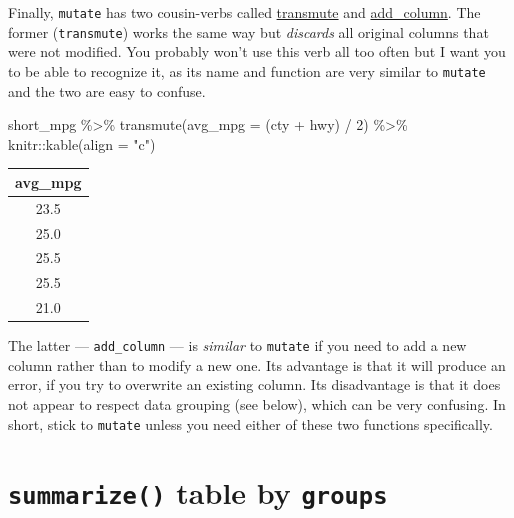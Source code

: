 \documentclass[
]{book}
\newenvironment{Shaded}{\begin{snugshade}}{\end{snugshade}}
\newcommand{\AttributeTok}[1]{\textcolor[rgb]{0.77,0.63,0.00}{#1}}
\newcommand{\DecValTok}[1]{\textcolor[rgb]{0.00,0.00,0.81}{#1}}
\newcommand{\FunctionTok}[1]{\textcolor[rgb]{0.00,0.00,0.00}{#1}}
\newcommand{\NormalTok}[1]{#1}
\newcommand{\SpecialCharTok}[1]{\textcolor[rgb]{0.00,0.00,0.00}{#1}}
\newcommand{\StringTok}[1]{\textcolor[rgb]{0.31,0.60,0.02}{#1}}
\begin{document}
Finally, \texttt{mutate} has two cousin-verbs called \href{}{transmute} and \href{https://tibble.tidyverse.org/reference/add_column.html}{add\_column}. The former (\texttt{transmute}) works the same way but \emph{discards} all original columns that were not modified. You probably won't use this verb all too often but I want you to be able to recognize it, as its name and function are very similar to \texttt{mutate} and the two are easy to confuse.

\begin{Shaded}
\begin{Highlighting}[]
\NormalTok{short\_mpg }\SpecialCharTok{\%\textgreater{}\%}
  \FunctionTok{transmute}\NormalTok{(}\AttributeTok{avg\_mpg =}\NormalTok{ (cty }\SpecialCharTok{+}\NormalTok{ hwy) }\SpecialCharTok{/} \DecValTok{2}\NormalTok{) }\SpecialCharTok{\%\textgreater{}\%}
\NormalTok{  knitr}\SpecialCharTok{::}\FunctionTok{kable}\NormalTok{(}\AttributeTok{align =} \StringTok{"c"}\NormalTok{)}
\end{Highlighting}
\end{Shaded}

\begin{tabular}{c}
\hline
avg\_mpg\\
\hline
23.5\\
\hline
25.0\\
\hline
25.5\\
\hline
25.5\\
\hline
21.0\\
\hline
\end{tabular}

The latter --- \texttt{add\_column} --- is \emph{similar} to \texttt{mutate} if you need to add a new column rather than to modify a new one. Its advantage is that it will produce an error, if you try to overwrite an existing column. Its disadvantage is that it does not appear to respect data grouping (see below), which can be very confusing. In short, stick to \texttt{mutate} unless you need either of these two functions specifically.

\hypertarget{summarize}{%
\section{\texorpdfstring{\texttt{summarize()} table by \texttt{groups}}{summarize() table by groups}}\label{summarize}}
\end{document}
